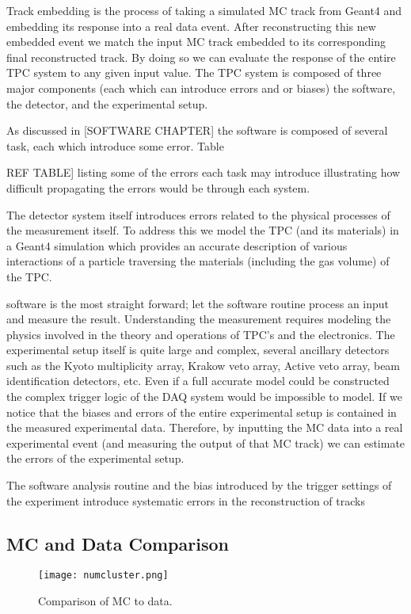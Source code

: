 Track embedding is the process of taking a simulated MC track from Geant4 and embedding its response into a real data event. After reconstructing this new embedded event we match the input MC track embedded to its corresponding final reconstructed track.  By doing so we can evaluate the response of the entire TPC system to any given input value. The TPC system is composed of three major components (each which can introduce errors and or biases) the software, the detector, and the experimental setup.  

As discussed in [SOFTWARE CHAPTER] the software is composed of several task, each which introduce some error. Table {REF TABLE] listing some of the errors each task may introduce illustrating how difficult propagating the errors would be through each system. 

The detector system itself introduces errors related to the physical processes of the measurement itself. To address this we model the TPC (and its materials) in a Geant4 simulation which provides an accurate description of various interactions of a particle traversing the materials (including the gas volume) of the TPC. 


 software is the most straight forward; let the software routine process an input and measure the result. Understanding the measurement requires modeling the physics involved in the theory and operations of TPC's and the  electronics. The experimental setup itself is quite large and complex, several ancillary detectors such as the Kyoto multiplicity array, Krakow veto array, Active veto array, beam identification detectors, etc. Even if a full accurate model could be constructed the complex trigger logic of the DAQ system would be impossible to model. If we notice that the biases and errors of the entire experimental setup is contained in the measured experimental data. Therefore, by inputting the MC data into a real experimental event (and measuring the output of that MC track) we can estimate the errors of the experimental setup. 

The software analysis routine and the bias introduced by the trigger settings of the experiment introduce systematic errors in the reconstruction of tracks

\subsection{MC and Data Comparison}

\begin{figure}[!hbt]
\texttt{[image: numcluster.png]}
\caption{Comparison of MC to data.}
\label{fig:clustcomp}
\end{figure}


}

